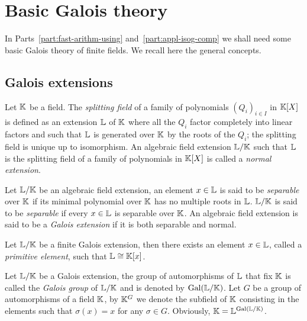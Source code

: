 \section{Basic Galois theory}
\label{sec:basic-galois-theory}
In Parts~\ref{part:fast-arithm-using} and~\ref{part:appl-isog-comp} we
shall need some basic Galois theory of finite fields. We recall here
the general concepts.

\subsection{Galois extensions}
\label{sec:basic-galois-theory:galois-extensions}
 Let $\mathbb{K}$ be
a field. The \textit{splitting field} of a
family of polynomials $(Q_i)_{i\in I}$ in $\mathbb{K}[X]$ is defined as an
extension $\mathbb{L}$ of $\mathbb{K}$ where all the $Q_i$ factor completely into
linear factors and such that $\mathbb{L}$ is generated over $\mathbb{K}$ by the roots
of the $Q_i$; the splitting field is unique up to isomorphism. An
algebraic field extension $\mathbb{L}/\mathbb{K}$ such that $\mathbb{L}$ is the splitting
field of a family of polynomials in $\mathbb{K}[X]$ is called a
\textit{normal extension}.

Let $\mathbb{L}/\mathbb{K}$ be an algebraic field extension, an element $x\in\mathbb{L}$ is
said to be \textit{separable} over $\mathbb{K}$ if
its minimal polynomial over $\mathbb{K}$ has no multiple roots in $\mathbb{L}$.
$\mathbb{L}/\mathbb{K}$ is said to be 
\textit{separable} if every $x\in\mathbb{L}$ is separable over $\mathbb{K}$. An
algebraic field extension is said to be a
\textit{Galois extension} if it is both
separable and normal.

\begin{theorem}
  Let $\mathbb{L}/\mathbb{K}$ be a finite Galois extension, then there exists an
  element $x\in\mathbb{L}$, called a
  \textit{primitive element}, such that
  $\mathbb{L}\cong\mathbb{K}[x]$.
\end{theorem}

Let $\mathbb{L}/\mathbb{K}$ be a Galois extension, the group of automorphisms of
$\mathbb{L}$ that fix $\mathbb{K}$ is called the \textit{Galois
  group} of $\mathbb{L}/\mathbb{K}$ and is denoted by
$\operatorname{Gal}(\mathbb{L}/\mathbb{K})$.  Let
$G$ be a group of automorphisms of a field $\mathbb{K}$, by
$\mathbb{K}^G$ we denote the subfield of $\mathbb{K}$
consisting in the elements such that $\sigma(x)=x$ for any $\sigma\in
G$. Obviously, $\mathbb{K}=\mathbb{L}^{\operatorname{Gal}(\mathbb{L}/\mathbb{K})}$.

